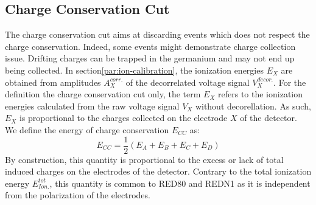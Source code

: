 \subsection{Charge Conservation Cut}
\label{par:charge-conservation-cut}

The charge conservation cut aims at discarding events which does not respect the charge conservation. Indeed, some events might demonstrate charge collection issue. Drifting charges can be trapped in the germanium and may not end up being collected. In section\ref{par:ion-calibration}, the ionization energies $E_X$ are obtained from amplitudes $A_{X}^{corr.}$ of the decorrelated voltage signal $V_X^{decor.}$. For the definition the charge conservation cut only, the term $E_X$ refers to the ionization energies calculated from the raw voltage signal $V_X$ without decorellation. As such, $E_X$ is proportional to the charges collected on the electrode $X$ of the detector. We define the energy of charge conservation $E_{CC}$ as:
\begin{equation}
E_{CC} = \frac{1}{2} \left( E_A + E_B + E_C + E_D \right)
\end{equation}
By construction, this quantity is proportional to the excess or lack of total induced charges on the electrodes of the detector. Contrary to the total ionization energy $E_{Ion.}^{tot}$, this quantity is common to RED80 and REDN1  as it is independent from the polarization of the electrodes.

